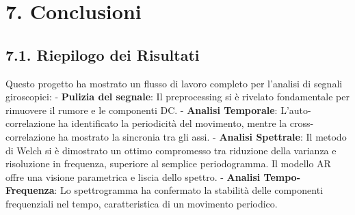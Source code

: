 \documentclass[11pt]{article}
\begin{document}
    \section{7. Conclusioni}\label{conclusioni}

\subsection{7.1. Riepilogo dei Risultati}\label{riepilogo-dei-risultati}

Questo progetto ha mostrato un flusso di lavoro completo per l'analisi
di segnali giroscopici: - \textbf{Pulizia del segnale}: Il preprocessing
si è rivelato fondamentale per rimuovere il rumore e le componenti DC. -
\textbf{Analisi Temporale}: L'auto-correlazione ha identificato la
periodicità del movimento, mentre la cross-correlazione ha mostrato la
sincronia tra gli assi. - \textbf{Analisi Spettrale}: Il metodo di Welch
si è dimostrato un ottimo compromesso tra riduzione della varianza e
risoluzione in frequenza, superiore al semplice periodogramma. Il
modello AR offre una visione parametrica e liscia dello spettro. -
\textbf{Analisi Tempo-Frequenza}: Lo spettrogramma ha confermato la
stabilità delle componenti frequenziali nel tempo, caratteristica di un
movimento periodico.


    
    
    
\end{document}

